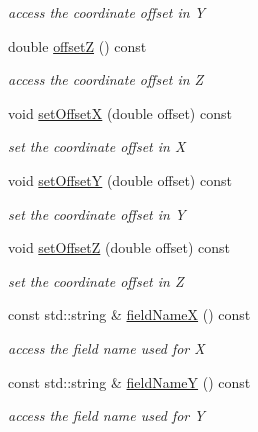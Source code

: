 \begin{DoxyCompactItemize}
\begin{DoxyCompactList}\small\item\em access the coordinate offset in Y \end{DoxyCompactList}\item 
double \hyperlink{class_d_d4hep_1_1_geometry_1_1_cartesian_grid_x_y_z_a16de7326efae924cfb33d23e27154b5d}{offsetZ} () const
\begin{DoxyCompactList}\small\item\em access the coordinate offset in Z \end{DoxyCompactList}\item 
void \hyperlink{class_d_d4hep_1_1_geometry_1_1_cartesian_grid_x_y_z_a00dd0a96276deeeed7507f9e91320bb0}{set\+OffsetX} (double offset) const
\begin{DoxyCompactList}\small\item\em set the coordinate offset in X \end{DoxyCompactList}\item 
void \hyperlink{class_d_d4hep_1_1_geometry_1_1_cartesian_grid_x_y_z_a48f8934a40c07f1dbfff9be21211da22}{set\+OffsetY} (double offset) const
\begin{DoxyCompactList}\small\item\em set the coordinate offset in Y \end{DoxyCompactList}\item 
void \hyperlink{class_d_d4hep_1_1_geometry_1_1_cartesian_grid_x_y_z_a91df366b3e0ade7feca516c765f1f8dd}{set\+OffsetZ} (double offset) const
\begin{DoxyCompactList}\small\item\em set the coordinate offset in Z \end{DoxyCompactList}\item 
const std\+::string \& \hyperlink{class_d_d4hep_1_1_geometry_1_1_cartesian_grid_x_y_z_a7eed50ee95125da7cfded93eb1bbe7f1}{field\+NameX} () const
\begin{DoxyCompactList}\small\item\em access the field name used for X \end{DoxyCompactList}\item 
const std\+::string \& \hyperlink{class_d_d4hep_1_1_geometry_1_1_cartesian_grid_x_y_z_a4925d5d084f6029486834b5cae5d7fe0}{field\+NameY} () const
\begin{DoxyCompactList}\small\item\em access the field name used for Y \end{DoxyCompactList}\item 

\end{DoxyCompactItemize}
